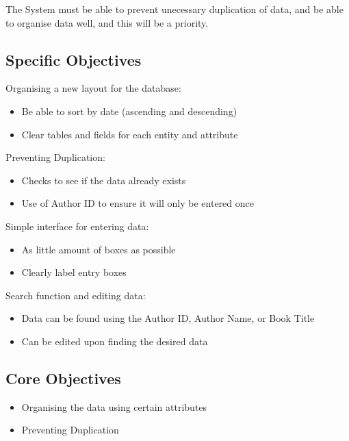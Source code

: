 The System must be able to prevent unecessary duplication of data, and be able to organise data well, and this will be a priority.

\subsection{Specific Objectives}

Organising a new layout for the database:

\begin{itemize}
    \item Be able to sort by date (ascending and descending)
    \item Clear tables and fields for each entity and attribute
\end{itemize}


Preventing Duplication:

\begin{itemize}
    \item Checks to see if the data already exists
    \item Use of Author ID to ensure it will only be entered once
\end{itemize}


Simple interface for entering data:

\begin{itemize}
    \item As little amount of boxes as possible
    \item Clearly label entry boxes
\end{itemize}


Search function and editing data:

\begin{itemize}
    \item Data can be found using the Author ID, Author Name, or Book Title
    \item Can be edited upon finding the desired data
\end{itemize}

\subsection{Core Objectives}

\begin{itemize}
    \item Organising the data using certain attributes
    \item Preventing Duplication
\end{itemize}

